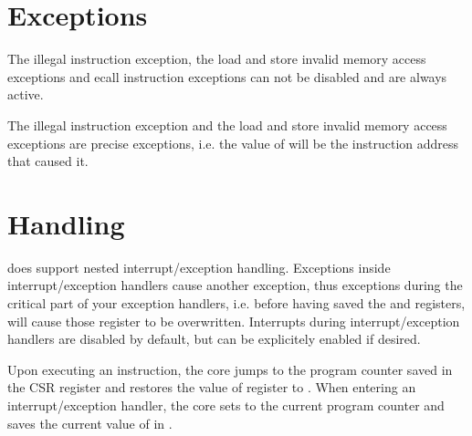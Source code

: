 \section{Exceptions}

The illegal instruction exception, the load and store invalid memory access
exceptions and ecall instruction exceptions can not be disabled and are always
active.

The illegal instruction exception and the load and store invalid memory access
exceptions are precise exceptions, i.e. the value of  will be the
instruction address that caused it.

\section{Handling}

\rvcore does support nested interrupt/exception handling. Exceptions inside
interrupt/exception handlers cause another exception, thus exceptions during the
critical part of your exception handlers, i.e. before having saved the
 and  registers, will cause those register to be
overwritten.
Interrupts during interrupt/exception handlers are disabled by default, but can
be explicitely enabled if desired.

Upon executing an  instruction, the core jumps to the program
counter saved in the CSR register  and restores the value of
register  to . When entering an
interrupt/exception handler, the core sets  to the current program
counter and saves the current value of  in .
